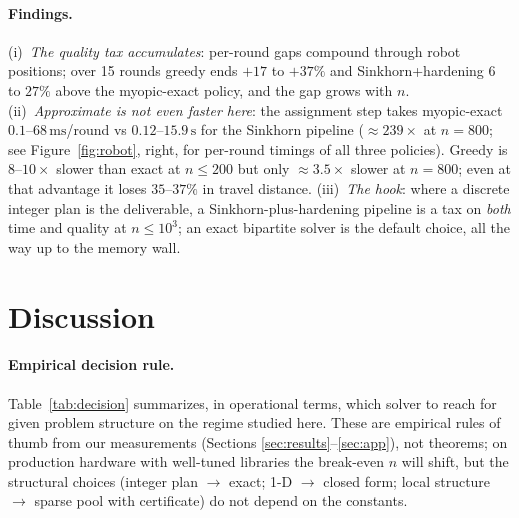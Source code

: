 \documentclass[11pt]{article}
\theoremstyle{remark}
\begin{document}
\paragraph{Findings.}
(i)~\emph{The quality tax accumulates}: per-round gaps compound through
robot positions; over 15 rounds greedy ends $+17$ to $+37\%$ and
Sinkhorn+hardening $6$ to $27\%$ above the myopic-exact policy, and the
gap grows with $n$. (ii)~\emph{Approximate is not even faster here}: the
assignment step takes myopic-exact $0.1$--$68\,\mathrm{ms}$/round vs
$0.12$--$15.9\,\mathrm{s}$ for the Sinkhorn pipeline ($\approx 239\times$
at $n=800$; see Figure~\ref{fig:robot}, right, for per-round timings of
all three policies). Greedy is $8$--$10\times$ slower than exact at
$n\le 200$ but only $\approx 3.5\times$ slower at $n=800$; even at that
advantage it loses $35$--$37\%$ in travel distance.
(iii)~\emph{The hook}: where a discrete integer plan is the deliverable,
a Sinkhorn-plus-hardening pipeline is a tax on \emph{both}
time and quality at $n\le 10^3$; an exact bipartite solver is the default
choice, all the way up to the memory wall.

\section{Discussion}
\label{sec:disc}

\paragraph{Empirical decision rule.}
Table~\ref{tab:decision} summarizes, in operational terms, which solver
to reach for given problem structure on the regime studied here. These
are empirical rules of thumb from our measurements (Sections
\ref{sec:results}--\ref{sec:app}), not theorems; on production hardware
with well-tuned libraries the break-even $n$ will shift, but the
structural choices (integer plan $\to$ exact; 1-D $\to$ closed form;
local structure $\to$ sparse pool with certificate) do not depend on the
constants.
\end{document}
